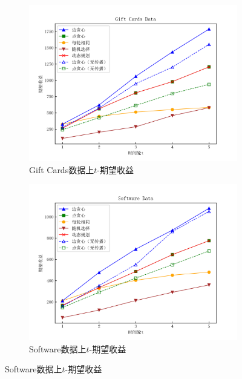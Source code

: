 \begin{figure}[th]
    \centering
    \begin{subfigure}{0.45\textwidth}
        \includegraphics[width=\linewidth]{figure/sasim/nonadp/non_cn_gift}
        \caption{Gift Cards数据上$t$-期望收益}
        \label{fig:non1}
    \end{subfigure}
    \hfill
    \begin{subfigure}{0.45\textwidth}
        \includegraphics[width=\linewidth]{figure/sasim/nonadp/non_cn_software}
        \caption{Software数据上$t$-期望收益}
        \label{fig:non2}
    \end{subfigure}

    \medskip


\end{figure}
